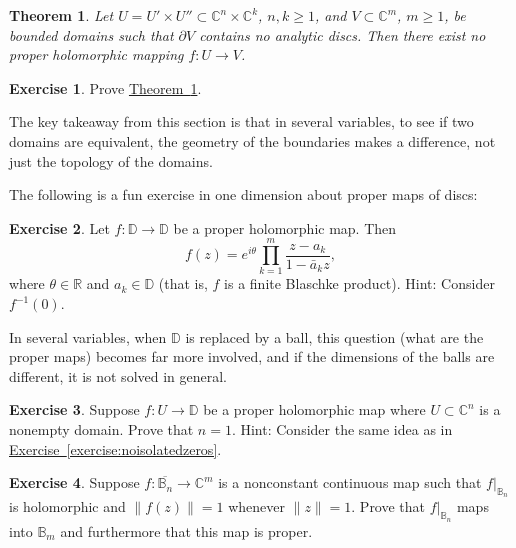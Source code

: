 \documentclass[12pt,openany]{book}
\newcommand{\snorm}[1]{\lVert {#1} \rVert}
\newcommand{\C}{{\mathbb{C}}}
\newcommand{\R}{{\mathbb{R}}}
\newcommand{\D}{{\mathbb{D}}}
\newcommand{\bB}{{\mathbb{B}}}
\theoremstyle{plain}
\newtheorem{thm}{Theorem}[section]
\theoremstyle{remark}
\theoremstyle{definition}
\newenvironment{exbox}{%
    \def\FrameCommand{\vrule width 1pt \relax\hspace{10pt}}%
    \MakeFramed{\advance\hsize-\width\FrameRestore}%
}{%
    \endMakeFramed
}
\theoremstyle{exercise}
\newtheorem{exercise}{Exercise}[section]
\theoremstyle{example}
\newcommand{\exerciseref}[1]{\hyperref[#1]{Exercise~\ref*{#1}}}
\newcommand{\thmref}[1]{\hyperref[#1]{Theorem~\ref*{#1}}}
\begin{document}
\begin{thm} \label{thm:nopropmapprodandnodisc}
Let $U = U' \times U'' \subset \C^n \times \C^k$, $n,k \geq 1$, and $V
\subset \C^m$, $m \geq 1$, be bounded
domains such that $\partial V$ contains no analytic discs.
Then there exist no proper
holomorphic mapping $f \colon U \to V$.
\end{thm}

\begin{exbox}
\begin{exercise}
Prove \thmref{thm:nopropmapprodandnodisc}.
\end{exercise}
\end{exbox}

The key takeaway from this section is that
in several variables, to see if two domains are equivalent,
the geometry of the boundaries makes a difference,
not just the topology of the domains.

\medskip

The following is a fun exercise in one dimension about proper maps of discs:

\begin{exbox}
\begin{exercise}
Let $f \colon \D \to \D$ be a proper holomorphic  map.  Then
\begin{equation*}
f(z) =
e^{i\theta} \prod_{k=1}^m \frac{z-a_k}{1-\bar{a}_k z} ,
\end{equation*}
where $\theta \in \R$ and $a_k \in \D$ (that is, $f$ is a finite
Blaschke product).  Hint: Consider $f^{-1}(0)$.
\end{exercise}
\end{exbox}

In several variables, when $\D$ is replaced by a ball,
this question (what are the proper maps)
becomes far more involved, and if the dimensions of the balls are
different, it is not solved in general.

\begin{exbox}
\begin{exercise}
Suppose $f \colon U \to \D$ be a proper holomorphic map where $U \subset
\C^n$ is a nonempty domain.  Prove that $n=1$.  Hint: Consider the same idea as in
\exerciseref{exercise:noisolatedzeros}.
\end{exercise}

\begin{exercise}
Suppose $f \colon \overline{\bB_n} \to \C^m$ is a nonconstant continuous
map such that $f|_{\bB_n}$ is holomorphic and $\snorm{f(z)} = 1$ whenever
$\snorm{z}=1$.  Prove that
$f|_{\bB_n}$ maps into $\bB_m$ and furthermore that this map is proper.
\end{exercise}
\end{exbox}
\end{document}
